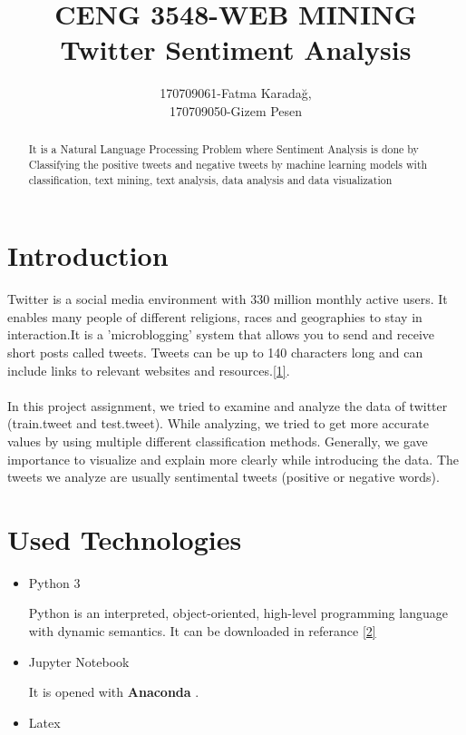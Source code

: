 \documentclass[onecolumn]{article}
\title{CENG 3548-WEB MINING\\ Twitter Sentiment Analysis}
\author{170709061-Fatma Karadağ,\\ 170709050-Gizem Pesen }
\begin{document}
\maketitle

\tableofcontents


\begin{abstract}
It is a Natural Language Processing Problem where Sentiment Analysis is done by Classifying the positive tweets and negative tweets by machine learning models with classification, text mining, text analysis, data analysis and data visualization
  
\end{abstract}



\section{Introduction}

Twitter is a social media environment with 330 million monthly active users. It enables many people of different religions, races and geographies to stay in interaction.It is a 'microblogging' system that allows you to send and receive short posts called tweets. Tweets can be up to 140 characters long and can include links to relevant websites and resources.\href{https://esrc.ukri.org/research/impact-toolkit/social-media/twitter/what-is-twitter/}{ {[1]}}. \\\\In this project assignment, we tried to examine and analyze the data of twitter (train.tweet and test.tweet).
While analyzing, we tried to get more accurate values by using multiple different classification methods.
Generally, we gave importance to visualize and explain more clearly while introducing the data.
The tweets we analyze are usually sentimental tweets (positive or negative words).

\section{Used Technologies}

\begin{itemize}
\item Python 3

Python is an interpreted, object-oriented, high-level programming language with dynamic semantics. It can be downloaded in referance
\href{https://www.python.org/downloads/}{ {[2]}}


\item Jupyter Notebook

It is opened with \textbf{Anaconda }.

\item Latex
\end{itemize}
\end{document}
